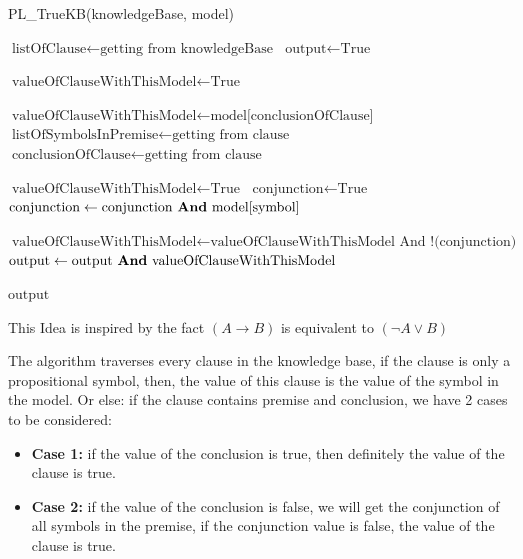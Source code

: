 \documentclass{assignment}
\begin{document}
\begin{algorithm}
\caption{PL\_TrueKB(knowledgeBase, model)}
\small %
\begin{algorithmic}[1]
    \State $\text{listOfClause} \gets \text{getting from knowledgeBase}$
    \State $\text{output} \gets \text{True}$
    
        \State $\text{valueOfClauseWithThisModel} \gets \text{True}$
        
            \State $\text{valueOfClauseWithThisModel} \gets \text{model[conclusionOfClause]}$
        \Else
            \State $\text{listOfSymbolsInPremise} \gets \text{getting from clause}$
            \State $\text{conclusionOfClause} \gets \text{getting from clause}$
            
                \State $\text{valueOfClauseWithThisModel} \gets \text{True}$
            \Else
                \State $\text{conjunction} \gets \text{True}$
                    \State $\text{conjunction} \gets \text{conjunction \textbf{And} model[symbol]}$
                \EndFor
                
                \State $\text{valueOfClauseWithThisModel} \gets \text{valueOfClauseWithThisModel And !(conjunction)}$
            \EndIf
        \EndIf
        \State $\text{output} \gets \text{output \textbf{And} valueOfClauseWithThisModel}$
    \EndFor
    
    \State \Return $\text{output}$
\EndFunction
\end{algorithmic}
\end{algorithm}

This Idea is inspired by the fact $(A \rightarrow B)$ is equivalent to $(\lnot A \vee B)$

The algorithm traverses every clause in the knowledge base, if the clause is only a propositional symbol, then, the value of this clause is the value of the symbol in the model. Or else: if the clause contains premise and conclusion, we have 2 cases to be considered:

\begin{itemize}
  \item \textbf{Case 1:} if the value of the conclusion is true, then definitely the value of the clause is true.
  \item \textbf{Case 2:} if the value of the conclusion is false, we will get the conjunction of all symbols in the premise, if the conjunction value is false, the value of the clause is true.
\end{itemize}
\end{document}
